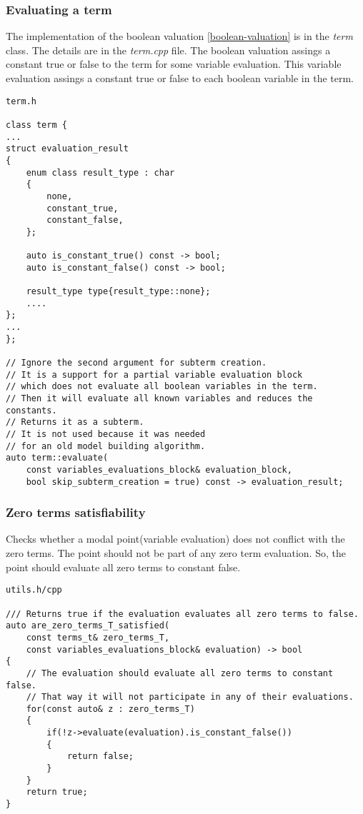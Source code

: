 \documentclass{article}
\begin{document}
	\newpage
	\subsubsection*{Evaluating a term}
	The implementation of the boolean valuation \ref{boolean-valuation} is in the \textit{term} class. The details are in the \textit{term.cpp} file.
	The boolean valuation assings a constant true or false to the term for some variable evaluation. This variable evaluation assings a constant true or false to each boolean variable in the term.
\\
\begin{lstlisting}
term.h

class term {
...
struct evaluation_result
{
    enum class result_type : char
    {
        none,
        constant_true,
        constant_false,
    };

    auto is_constant_true() const -> bool;
    auto is_constant_false() const -> bool;

    result_type type{result_type::none};
	....
};
...
};

// Ignore the second argument for subterm creation.
// It is a support for a partial variable evaluation block
// which does not evaluate all boolean variables in the term.
// Then it will evaluate all known variables and reduces the constants.
// Returns it as a subterm.
// It is not used because it was needed
// for an old model building algorithm.
auto term::evaluate(
	const variables_evaluations_block& evaluation_block,
	bool skip_subterm_creation = true) const -> evaluation_result;
\end{lstlisting}

	\newpage
	\subsubsection*{Zero terms satisfiability}
	Checks whether a modal point(variable evaluation) does not conflict with the zero terms. The point should not be part of any zero term evaluation. So, the point should evaluate all zero terms to constant false.
\\
\begin{lstlisting}
utils.h/cpp

/// Returns true if the evaluation evaluates all zero terms to false.
auto are_zero_terms_T_satisfied(
	const terms_t& zero_terms_T,
	const variables_evaluations_block& evaluation) -> bool
{
    // The evaluation should evaluate all zero terms to constant false.
    // That way it will not participate in any of their evaluations.
    for(const auto& z : zero_terms_T)
    {
        if(!z->evaluate(evaluation).is_constant_false())
        {
            return false;
        }
    }
    return true;
}
\end{lstlisting}
\end{document}
